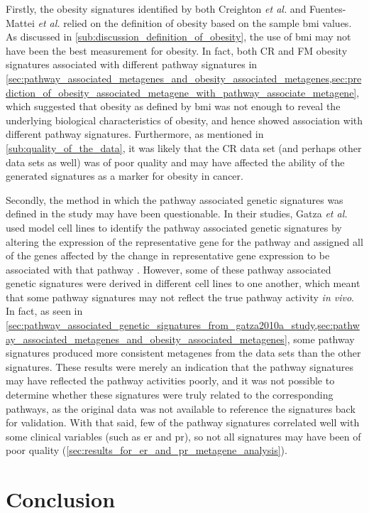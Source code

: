Firstly, the obesity signatures identified by both Creighton \textit{et al.} and Fuentes-Mattei \textit{et al.} relied on the definition of obesity based on the sample \gls{bmi} values.
As discussed in \cref{sub:discussion_definition_of_obesity}, the use of \gls{bmi} may not have been the best measurement for obesity.
In fact, both CR and FM obesity signatures associated with different pathway signatures in \cref{sec:pathway_associated_metagenes_and_obesity_associated_metagenes,sec:prediction_of_obesity_associated_metagene_with_pathway_associate_metagene}, which suggested that obesity as defined by \gls{bmi} was not enough to reveal the underlying biological characteristics of obesity, and hence showed association with different pathway signatures.
Furthermore, as mentioned in \cref{sub:quality_of_the_data}, it was likely that the CR data set (and perhaps other data sets as well) was of poor quality and may have affected the ability of the generated signatures as a marker for obesity in cancer.

Secondly, the method in which the pathway associated genetic signatures was defined in the \citet{Gatza2010a} study may have been questionable.
In their studies, Gatza \textit{et al.} used model cell lines to identify the pathway associated genetic signatures by altering the expression of the representative gene for the pathway and assigned all of the genes affected by the change in representative gene expression to be associated with that pathway \citep{Bild2006,Gatza2010a}.
However, some of these pathway associated genetic signatures were derived in different cell lines to one another, which meant that some pathway signatures may not reflect the true pathway activity \textit{in vivo}.
In fact, as seen in \cref{sec:pathway_associated_genetic_signatures_from_gatza2010a_study,sec:pathway_associated_metagenes_and_obesity_associated_metagenes}, some pathway signatures produced more consistent metagenes from the data sets than the other signatures.
These results were merely an indication that the pathway signatures may have reflected the pathway activities poorly, and it was not possible to determine whether these signatures were truly related to the corresponding pathways, as the original data was not available to reference the signatures back for validation.
With that said, few of the pathway signatures correlated well with some clinical variables (such as \gls{er} and \gls{pr}), so not all signatures may have been of poor quality (\cref{sec:results_for_er_and_pr_metagene_analysis}).

\section{Conclusion}
\label{sec:conclusion}

